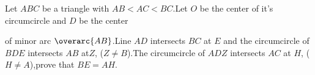 Let $ABC$ be a triangle with $AB<AC<BC$.Let $O$ be the center of it's circumcircle and $D$ be the center

of minor arc $\overarc{AB}$.Line $AD$ intersects $BC$ at $E$ and the circumcircle of $BDE$ intersects $AB$ at$Z$, ($Z\not=B$).The circumcircle of $ADZ$ intersects $AC$ at $H$, ($H\not=A$),prove that $BE=AH$.